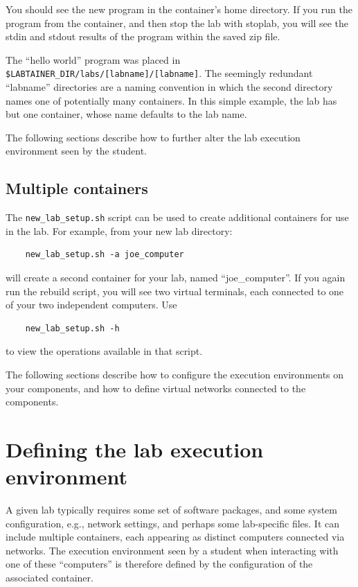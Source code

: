 \documentclass[12pt]{article}
\begin{document}
You should see the new program in the container's
home directory.  If you run the program from the container, and then stop the lab
with stoplab, you will see the stdin and stdout results of the program within the
saved zip file.

The ``hello world'' program was placed in \verb!$LABTAINER_DIR/labs/[labname]/[labname]!.
The seemingly redundant ``labname'' directories are a naming convention in which the
second directory names one of potentially many containers.  In this simple example,
the lab has but one container, whose name defaults to the lab name.

The following sections describe how to further alter the lab execution environment seen by 
the student.

\subsection {Multiple containers}
The {\tt new\_lab\_setup.sh} script can be used to create additional containers for use
in the lab.  For example, from your new lab directory:
\begin{verbatim}
    new_lab_setup.sh -a joe_computer
\end{verbatim}
\noindent will create a second container for your lab,
named ``joe\_computer''.  If you again run the rebuild script, you will see two virtual
terminals, each connected to one of your two independent computers.  Use 
\begin{verbatim}
    new_lab_setup.sh -h
\end{verbatim}
\noindent to view the operations available in that script.

The following sections describe how to configure the execution environments on your components,
and how to define virtual networks connected to the components.

\section {Defining the lab execution environment}
\label{execution environment}
A given lab typically requires some set of software packages, and some
system configuration, e.g., network settings, and perhaps some lab-specific
files.  It can include multiple containers, each appearing as distinct
computers connected via networks.  The execution environment seen by a
student when interacting with one of these ``computers'' is therefore defined
by the configuration of the associated container. 
\end{document}
